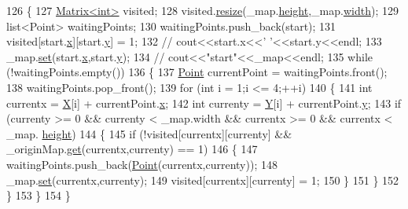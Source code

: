\begin{DoxyCode}
126 \{
127     \hyperlink{classMatrix}{Matrix<int>} visited;
128     visited.\hyperlink{classMatrix_a15ce96c8af4c7a982c2c10b96f29cea1}{resize}(\_map.\hyperlink{classBitMatrix_a3b7a1be96313cacfd3b2a08661dd919c}{height},\_map.\hyperlink{classBitMatrix_ac271de23ac5446a0a75ee457a385d882}{width});
129     list<Point> waitingPoints;
130     waitingPoints.push\_back(start);
131     visited[start.\hyperlink{classPoint_a8c779e11e694b20e0946105a9f5de842}{x}][start.\hyperlink{classPoint_a2e1b5fb2b2a83571f5c0bc0f66a73cf7}{y}] = 1;
132     \textcolor{comment}{// cout<<start.x<<' '<<start.y<<endl;}
133     \_map.\hyperlink{classBitMatrix_ad26dd2e93e9d24d70834d6d79e29c81e}{set}(start.\hyperlink{classPoint_a8c779e11e694b20e0946105a9f5de842}{x},start.\hyperlink{classPoint_a2e1b5fb2b2a83571f5c0bc0f66a73cf7}{y});
134     \textcolor{comment}{// cout<<"start"<<\_map<<endl;}
135     \textcolor{keywordflow}{while} (!waitingPoints.empty())
136     \{
137         \hyperlink{classPoint}{Point} currentPoint = waitingPoints.front();
138         waitingPoints.pop\_front();
139         \textcolor{keywordflow}{for} (\textcolor{keywordtype}{int} i = 1;i <= 4;++i)
140         \{
141             \textcolor{keywordtype}{int} currentx = \hyperlink{CleverOptimizie_8cpp_a34adaf40bb2f109e151ba28ccc73c677}{X}[i] + currentPoint.\hyperlink{classPoint_a8c779e11e694b20e0946105a9f5de842}{x};
142             \textcolor{keywordtype}{int} currenty = \hyperlink{CleverOptimizie_8cpp_a86f15c23d2ab23bfebe784c368885663}{Y}[i] + currentPoint.\hyperlink{classPoint_a2e1b5fb2b2a83571f5c0bc0f66a73cf7}{y};
143             \textcolor{keywordflow}{if} (currenty >= 0 && currenty < \_map.width && currentx >= 0 && currentx < \_map.
      \hyperlink{classBitMatrix_a3b7a1be96313cacfd3b2a08661dd919c}{height})
144             \{
145                 \textcolor{keywordflow}{if} (!visited[currentx][currenty] && \_originMap.\hyperlink{classBitMatrix_ad19d1045b54ccc8a99d70d38305b4ca6}{get}(currentx,currenty) == 1)
146                 \{
147                     waitingPoints.push\_back(\hyperlink{classPoint}{Point}(currentx,currenty));
148                     \_map.\hyperlink{classBitMatrix_ad26dd2e93e9d24d70834d6d79e29c81e}{set}(currentx,currenty);
149                     visited[currentx][currenty] = 1;
150                 \}
151             \}
152         \}
153     \}
154 \}
\end{DoxyCode}


